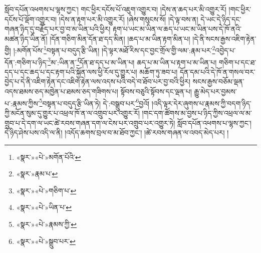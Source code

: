 སློབ་དཔོན་འཕགས་པ་ལྷས་ཀྱང་། གང་ཕྱིར་དངོས་པོ་འཇུག་འགྱུར་བ། །དེས་ན་ཆད་པར་མི་འགྱུར་རོ། །གང་ཕྱིར་དངོས་པོ་ལྡོག་འགྱུར་བ། །དེས་ན་རྟག་པར་མི་འགྱུར་རོ། །ཞེས་གསུངས་སོ། །དེ་ལྟ་བས་ན། དེ་ཡང་དེ་ཉིད་དང་གཞན་ཉིད་དུ་བརྗོད་པར་བྱ་བ་མ་ཡིན་པའི་ཕྱིར། རྟག་པ་ཡང་མ་ཡིན་ལ་ཆད་པ་ཡང་མ་ཡིན་པས་དེ་ཁོ་ནའི་མཚན་ཉིད་ཡིན་ནོ། །དོན་གཅིག་མིན་དོན་ཐ་དད་མིན། །ཆད་པ་མ་ཡིན་རྟག་མིན་པ། །དེ་ནི་སངས་རྒྱས་འཇིག་རྟེན་གྱི། །:མགོན་པོས་\footnote{«སྣར་»«པེ་»མགོན་པོའི་}བསྟན་པ་བདུད་རྩི་ཡིན། །དེ་ལྟར་མཐོ་རིས་དང་བྱང་གྲོལ་གྱི་ལམ་:རྣམ་པར་\footnote{«སྣར་»རྣམ་པ་}འབྱེད་པ་དོན་:གཅིག་པ་ཉིད་\footnote{«སྣར་»«པེ་»གཅིག་པ་}མ་:ཡིན་ན་\footnote{«སྣར་»«པེ་»ཡིན་པ་}དོན་ཐ་དད་པ་མ་ཡིན་པ། ཆད་པ་མ་ཡིན་པ་རྟག་པ་མ་ཡིན་པ། གཅིག་པ་དང་ཐ་དད་པ་དང་ཆད་པ་དང་རྟག་པའི་སྐྱོན་ལས་ཕྱི་རོལ་དུ་གྱུར་པ། མཆོག་ཏུ་ཟབ་པ། དོན་དམ་པའི་དེ་ཁོ་ན་གསལ་བར་བྱེད་པ་དེ་ནི་འཇིག་རྟེན་དང་འཇིག་རྟེན་ལས་འདས་པའི་བདེ་བ་ཐོབ་པར་བྱ་བའི་ཕྱིར། སངས་རྒྱས་བཅོམ་ལྡན་འདས་ཐམས་ཅད་མཁྱེན་པ་ཐམས་ཅད་གཟིགས་པ། སྟོབས་བཅུའི་སྟོབས་དང་ལྡན་པ། རྒྱུ་མེད་པར་བྱམས་པ་:རྣམས་ཀྱིས་\footnote{«སྣར་»«པེ་»རྣམས་ཀྱི་}བསྟན་པ་བདུད་རྩི་ཡིན་ཏེ། དེ་:བསྒྲུབ་པར་\footnote{«སྣར་»«པེ་»སྒྲུབ་པར་}བྱའོ། །འདི་ལྟར་དེར་ཞུགས་པ་རྣམས་ཀྱི་བདག་ཉིད་ཀྱི་མངོན་སུམ་དུ་གྱུར་པ་འཕྲལ་ཁོ་ན་ལ་འགྲུབ་པར་འགྱུར་རོ། །གང་དག་ཚོགས་མ་བྱས་པ་ཉིད་ཀྱིས་འཕྲལ་ལ་མ་གྲུབ་པ་དེ་དག་ལ་ཡང་ཚེ་རབས་གཞན་དག་ལ་ངེས་པར་འགྲུབ་པར་འགྱུར་ཏེ། སློབ་དཔོན་འཕགས་པ་ལྷས་ཀྱང་། དེ་ཉིད་ཤེས་པས་འདི་ལ་ནི། །འདོད་ཆགས་བྲལ་བ་མ་ཐོབ་ཀྱང་། །ཚེ་རབས་གཞན་ལ་འབད་མེད་པར། །
